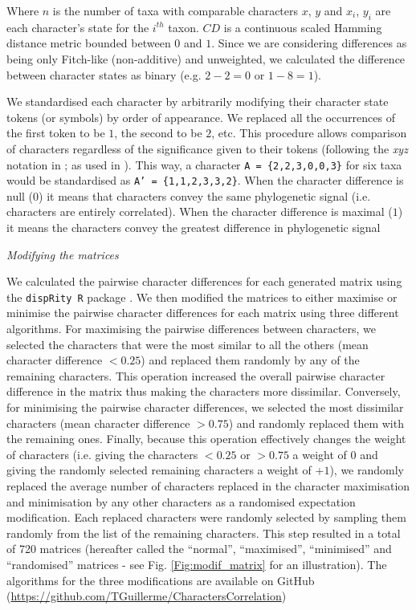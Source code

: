 \documentclass[12pt,letterpaper]{article}
\renewcommand{\subsection}[1]{%
\bigskip
\begin{center}
\begin{large}
\normalfont\itshape #1
\end{large}
\end{center}}
\begin{document}
\noindent Where $n$ is the number of taxa with comparable characters $x$, $y$ and $x_i$, $y_i$ are each character's state for the $i^{th}$ taxon.
$CD$ is a continuous scaled Hamming distance metric bounded between $0$ and $1$.
Since we are considering differences as being only Fitch-like (non-additive) and unweighted, we calculated the difference between character states as binary (e.g. $2 - 2 = 0$ or $1 - 8 = 1$).

We standardised each character by arbitrarily modifying their character state tokens (or symbols) by order of appearance.
We replaced all the occurrences of the first token to be $1$, the second to be $2$, etc.
This procedure allows comparison of characters regardless of the significance given to their tokens (following the \textit{xyz} notation in \citealt{felsenstein2004inferring}; as used in \citealt{Davalos01072014}).
This way, a character \texttt{A = \{2,2,3,0,0,3\}} for six taxa would be standardised as \texttt{A' = \{1,1,2,3,3,2\}}.
When the character difference is null ($0$) it means that characters convey the same phylogenetic signal (i.e. characters are entirely correlated). 
When the character difference is maximal ($1$) it means the characters convey the greatest difference in phylogenetic signal

\subsection{Modifying the matrices}
We calculated the pairwise character differences for each generated matrix using the \texttt{dispRity R} package \citep{thomas_guillerme_2016_55646}.
We then modified the matrices to either maximise or minimise the pairwise character differences for each matrix using three different algorithms.
For maximising the pairwise differences between characters, we selected the characters that were the most similar to all the others (mean character difference $<0.25$) and replaced them randomly by any of the remaining characters.
This operation increased the overall pairwise character difference in the matrix thus making the characters more dissimilar.
Conversely, for minimising the pairwise character differences, we selected the most dissimilar characters (mean character difference $>0.75$) and randomly replaced them with the remaining ones.
Finally, because this operation effectively changes the weight of characters (i.e. giving the characters $<0.25$ or $>0.75$ a weight of $0$ and giving the randomly selected remaining characters a weight of +$1$), we randomly replaced the average number of characters replaced in the character maximisation and minimisation by any other characters as a randomised expectation modification.
Each replaced characters were randomly selected by sampling them randomly from the list of the remaining characters.
This step resulted in a total of 720 matrices (hereafter called the ``normal'', ``maximised'', ``minimised'' and ``randomised'' matrices - see Fig. \ref{Fig:modif_matrix} for an illustration).
The algorithms for the three modifications are available on GitHub (\url{https://github.com/TGuillerme/CharactersCorrelation})
\end{document}
